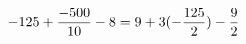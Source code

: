 \documentclass[preview]{standalone}
\begin{document}
\begin{align*}
\special{dvisvgm:raw <g id='unique000'>}-125 + \frac{-500}{10} - 8 = 9 + 3(- \frac{125}{2}) - \frac{9}{2}\special{dvisvgm:raw </g>}
\end{align*}
\end{document}
